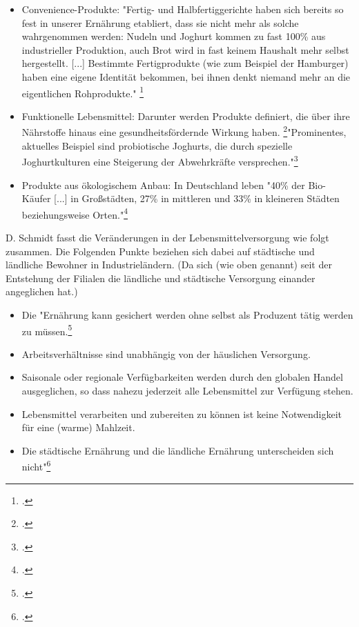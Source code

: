 \documentclass{scrartcl}
\begin{document}
 \begin{itemize}
\item Convenience-Produkte: "Fertig- und Halbfertiggerichte haben sich bereits so fest in unserer Ernährung etabliert, dass sie nicht mehr als solche wahrgenommen werden: Nudeln und Joghurt kommen zu fast 100\% aus industrieller Produktion, auch Brot wird in fast keinem Haushalt mehr selbst hergestellt. [...] Bestimmte Fertigprodukte (wie zum Beispiel der Hamburger)
haben eine eigene Identität bekommen, bei ihnen denkt niemand mehr an die eigentlichen Rohprodukte." \footcite{Escher2003EssenKultur}
\item Funktionelle Lebensmittel: Darunter werden Produkte definiert, die über ihre Nährstoffe hinaus eine gesundheitsfördernde Wirkung haben. \footcites[Vgl.][S.5]{Heasman1958-2001TheProfits}"Prominentes, aktuelles Beispiel sind probiotische Joghurts, die durch spezielle Joghurtkulturen eine Steigerung der Abwehrkräfte versprechen."\footcite[S.14]{Stierand2008StadtLebensmittel}
\item Produkte aus ökologischem Anbau: In Deutschland leben "40\% der Bio-Käufer [...] in Großstädten, 27\% in mittleren und 33\% in kleineren Städten beziehungsweise Orten."\footcite[S.14]{Stierand2008StadtLebensmittel}
\end{itemize}
D. Schmidt fasst die Veränderungen in der Lebensmittelversorgung wie folgt zusammen. Die Folgenden Punkte beziehen sich dabei auf städtische und ländliche Bewohner in Industrieländern. (Da sich (wie oben genannt) seit der Entstehung der Filialen die ländliche und städtische Versorgung einander angeglichen hat.)

\begin{itemize}
\item Die "Ernährung kann gesichert werden ohne selbst als Produzent tätig werden zu
müssen.\footcite[S.20]{SchmidtDieVon}
\item Arbeitsverhältnisse sind unabhängig von der häuslichen Versorgung.
\item Saisonale oder regionale Verfügbarkeiten werden durch den globalen Handel
ausgeglichen, so dass nahezu jederzeit alle Lebensmittel zur Verfügung stehen.
\item Lebensmittel verarbeiten und zubereiten zu können ist keine Notwendigkeit für
eine (warme) Mahlzeit.
\item Die städtische Ernährung und die ländliche Ernährung unterscheiden sich nicht"\footcite[S.20]{SchmidtDieVon}
\end{itemize}
\end{document}
